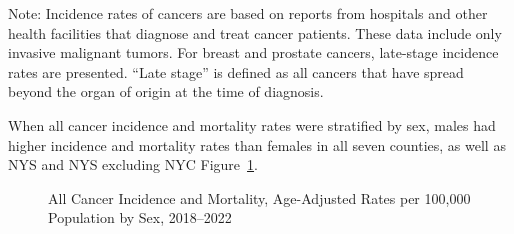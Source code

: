 \documentclass[
  english,
  letterpaper,
]{report}
\begin{document}
\begin{tcolorbox}[enhanced jigsaw, breakable, leftrule=.75mm, title=\textcolor{quarto-callout-note-color}{\faInfo}\hspace{0.5em}{Note}, bottomrule=.15mm, opacityback=0, left=2mm, colback=white, bottomtitle=1mm, coltitle=black, colbacktitle=quarto-callout-note-color!10!white, colframe=quarto-callout-note-color-frame, opacitybacktitle=0.6, toptitle=1mm, titlerule=0mm, arc=.35mm, rightrule=.15mm, toprule=.15mm]

Note: Incidence rates of cancers are based on reports from hospitals and
other health facilities that diagnose and treat cancer patients. These
data include only invasive malignant tumors. For breast and prostate
cancers, late-stage incidence rates are presented. ``Late stage'' is
defined as all cancers that have spread beyond the organ of origin at
the time of diagnosis.

\end{tcolorbox}

When all cancer incidence and mortality rates were stratified by sex,
males had higher incidence and mortality rates than females in all seven
counties, as well as NYS and NYS excluding NYC
Figure~\ref{fig-allca-incident-mortal-sex-aar}.

\begin{figure}


\caption{\label{fig-allca-incident-mortal-sex-aar}All Cancer Incidence
and Mortality, Age-Adjusted Rates per 100,000 Population by Sex,
2018--2022}

\end{figure}%
\end{document}
